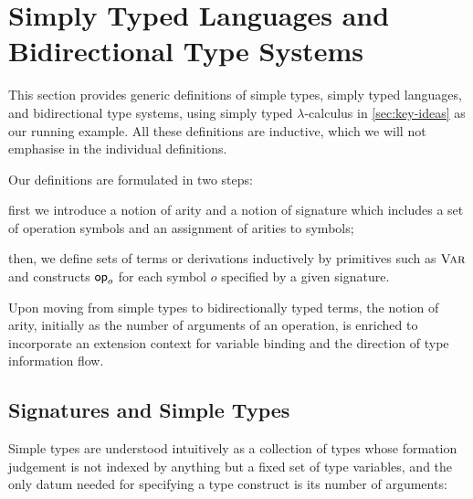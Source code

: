 
\section{Simply Typed Languages and Bidirectional Type Systems}\label{sec:defs}
This section provides generic definitions
of simple types, simply typed languages, and bidirectional type systems, using simply typed $\lambda$-calculus in \cref{sec:key-ideas} as our running example.
All these definitions are inductive, which we will not emphasise in the individual definitions.

Our definitions are formulated in two steps:
\begin{enumerate*}
  \item first we introduce a notion of arity and a notion of signature which includes a set of operation symbols and an assignment of arities to symbols;
\item then, we define sets of terms or derivations inductively by primitives such as $\textnormal{\textsc{Var}}$ and constructs $\mathsf{op}_o$ for each symbol $o$ specified by a given signature.
\end{enumerate*}
Upon moving from simple types to bidirectionally typed terms, the notion of arity, initially as the number of arguments of an operation, is enriched to incorporate an extension context for variable binding and the direction of type information flow.

\subsection{Signatures and Simple Types} \label{subsec:simple-types}
Simple types are understood intuitively as a collection of types whose formation judgement is not indexed by anything but a fixed set of type variables, and the only datum needed for specifying a type construct is its number of arguments:

